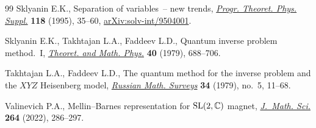 \documentclass[pdftex]{sigma}
\numberwithin{equation}{section}
\begin{document}
\begin{thebibliography}{99}
Sklyanin E.K., Separation of variables~-- new trends,
 \href{https://doi.org/10.1143/PTPS.118.35}{\textit{Progr. Theoret. Phys.
 Suppl.}} \textbf{118} (1995), 35--60,
 \href{http://arxiv.org/abs/solv-int/9504001}{arXiv:solv-int/9504001}.

Sklyanin E.K., Takhtajan L.A., Faddeev L.D., Quantum inverse problem
 method.~{I}, \href{https://doi.org/10.1007/BF01018718}{\textit{Theoret. and
 Math. Phys.}} \textbf{40} (1979), 688--706.

Takhtajan L.A., Faddeev L.D., The quantum method for the inverse problem and
 the {$XYZ$} {H}eisenberg model,
 \href{https://doi.org/10.1070/RM1979v034n05ABEH003909}{\textit{Russian Math.
 Surveys}} \textbf{34} (1979), no.~5, 11--68.

Valinevich P.A., Mellin--{B}arnes representation for {${\rm SL}(2,\mathbb{C})$}
 magnet, \href{https://doi.org/10.1007/s10958-022-05999-2}{\textit{J.~Math.
 Sci.}} \textbf{264} (2022), 286--297.

\end{thebibliography}\LastPageEnding
\end{document}
